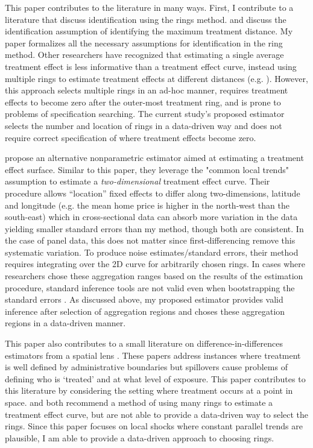This paper contributes to the literature in many ways. First, I contribute to a literature that discuss identification using the rings method. \citet{Sullivan_2017} and \citet{Gerardi_Rosenblatt_Willen_Yao_2015} discuss the identification assumption of identifying the maximum treatment distance. My paper formalizes all the necessary assumptions for identification in the ring method. Other researchers have recognized that estimating a single average treatment effect is less informative than a treatment effect curve, instead using multiple rings to estimate treatment effects at different distances (e.g. \citet{Alexander_Currie_Schnell_2019,Casey_Schiman_Wachala_2018,di2004police}). However, this approach selects multiple rings in an ad-hoc manner, requires treatment effects to become zero after the outer-most treatment ring, and is prone to problems of specification searching. The current study's proposed estimator selects the number and location of rings in a data-driven way and does not require correct specification of where treatment effects become zero.

\citet{diamond2019wants} propose an alternative nonparametric estimator aimed at estimating a treatment effect surface. Similar to this paper, they leverage the "common local trends" assumption to estimate a \textit{two-dimensional} treatment effect curve. Their procedure allows ``location'' fixed effects to differ along two-dimensions, latitude and longitude (e.g. the mean home price is higher in the north-west than the south-east) which in cross-sectional data can absorb more variation in the data yielding smaller standard errors than my method, though both are consistent. In the case of panel data, this does not matter since first-differencing remove this systematic variation. To produce noise estimates/standard errors, their method requires integrating over the 2D curve for arbitrarily chosen rings. In cases where researchers chose these aggregation ranges based on the results of the estimation procedure, standard inference tools are not valid even when bootstrapping the standard errors \citep{leeb2005model}. As discussed above, my proposed estimator provides valid inference after selection of aggregation regions and choses these aggregation regions in a data-driven manner.

This paper also contributes to a small literature on difference-in-differences estimators from a spatial lens \citep{Butts_2021,Clarke_2017,Berg_Streitz_2019,verbitsky2012causal,Delgado_Florax_2015}. These papers address instances where treatment is well defined by administrative boundaries but spillovers cause problems of defining who is `treated' and at what level of exposure. This paper contributes to this literature by considering the setting where treatment occurs at a point in space. \citet{Butts_2021} and \citet{Clarke_2017} both recommend a method of using many rings to estimate a treatment effect curve, but are not able to provide a data-driven way to select the rings. Since this paper focuses on local shocks where constant parallel trends are plausible, I am able to provide a data-driven approach to choosing rings. 

